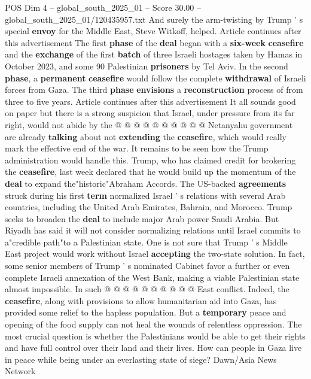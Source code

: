 \begin{textsample}{POS Dim 4 – global\_south\_2025\_01 – Score 30.00 – global\_south\_2025\_01/120435957.txt}
And surely the arm-twisting by Trump ' s special \textbf{envoy} for the Middle East, Steve Witkoff, helped.
Article continues after this advertisement The first \textbf{phase} of the \textbf{deal} began with a \textbf{six-week} \textbf{ceasefire} and the \textbf{exchange} of the first \textbf{batch} of three Israeli hostages taken by Hamas in October 2023, and some 90 Palestinian \textbf{prisoners} by Tel Aviv.
In the second \textbf{phase}, a \textbf{permanent} \textbf{ceasefire} would follow the complete \textbf{withdrawal} of Israeli forces from Gaza.
The third \textbf{phase} \textbf{envisions} a \textbf{reconstruction} process of from three to five years.
Article continues after this advertisement It all sounds good on paper but there is a strong suspicion that Israel, under pressure from its far right, would not abide by the @ @ @ @ @ @ @ @ @ @ Netanyahu government are already \textbf{talking} about not \textbf{extending} the \textbf{ceasefire}, which would really mark the effective end of the war.
It remains to be seen how the Trump administration would handle this.
Trump, who has claimed credit for brokering the \textbf{ceasefire}, last week declared that he would build up the momentum of the \textbf{deal} to expand the"historic"Abraham Accords.
The US-backed \textbf{agreements} struck during his first \textbf{term} normalized Israel ' s relations with several Arab countries, including the United Arab Emirates, Bahrain, and Morocco.
Trump seeks to broaden the \textbf{deal} to include major Arab power Saudi Arabia.
But Riyadh has said it will not consider normalizing relations until Israel commits to a"credible path"to a Palestinian state.
One is not sure that Trump ' s Middle East project would work without Israel \textbf{accepting} the two-state solution.
In fact, some senior members of Trump ' s nominated Cabinet favor a further or even complete Israeli annexation of the West Bank, making a viable Palestinian state almost impossible.
In such @ @ @ @ @ @ @ @ @ @ East conflict.
Indeed, the \textbf{ceasefire}, along with provisions to allow humanitarian aid into Gaza, has provided some relief to the hapless population.
But a \textbf{temporary} peace and opening of the food supply can not heal the wounds of relentless oppression.
The most crucial question is whether the Palestinians would be able to get their rights and have full control over their land and their lives.
How can people in Gaza live in peace while being under an everlasting state of siege?
Dawn/Asia News Network

\end{textsample}
